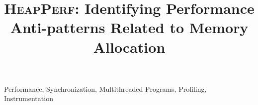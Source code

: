 \documentclass[preprint,10pt]{sigplanconf}
\newcommand{\HeapPerf}{{\scshape HeapPerf}}
\begin{document}
\setlength{\pdfpageheight}{\paperheight}
\setlength{\pdfpagewidth}{\paperwidth}


\title{{\huge \bf \HeapPerf{}}: Identifying Performance Anti-patterns Related to Memory Allocation}%







\maketitle

\begin{abstract}

\end{abstract}


\keywords
Performance, Synchronization, Multithreaded Programs, Profiling, Instrumentation



\end{document}
